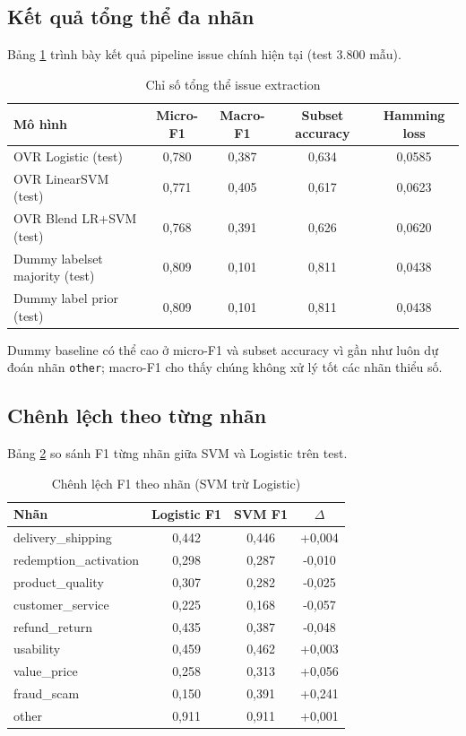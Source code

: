 ﻿\documentclass[12pt,a4paper]{article}
\begin{document}
\subsection{Kết quả tổng thể đa nhãn}
Bảng \ref{tab:issue_overall_vi} trình bày kết quả pipeline issue chính hiện tại (test 3.800 mẫu).

\begin{table}[H]
\centering
\caption{Chỉ số tổng thể issue extraction}
\label{tab:issue_overall_vi}
\begin{tabular}{lcccc}
\toprule
Mô hình & Micro-F1 & Macro-F1 & Subset accuracy & Hamming loss \\
\midrule
OVR Logistic (test) & 0,780 & 0,387 & 0,634 & 0,0585 \\
OVR LinearSVM (test) & 0,771 & 0,405 & 0,617 & 0,0623 \\
OVR Blend LR+SVM (test) & 0,768 & 0,391 & 0,626 & 0,0620 \\
Dummy labelset majority (test) & 0,809 & 0,101 & 0,811 & 0,0438 \\
Dummy label prior (test) & 0,809 & 0,101 & 0,811 & 0,0438 \\
\bottomrule
\end{tabular}
\end{table}

Dummy baseline có thể cao ở micro-F1 và subset accuracy vì gần như luôn dự đoán nhãn \texttt{other}; macro-F1 cho thấy chúng không xử lý tốt các nhãn thiểu số.

\subsection{Chênh lệch theo từng nhãn}
Bảng \ref{tab:issue_delta_vi} so sánh F1 từng nhãn giữa SVM và Logistic trên test.

\begin{table}[H]
\centering
\caption{Chênh lệch F1 theo nhãn (SVM trừ Logistic)}
\label{tab:issue_delta_vi}
\begin{tabular}{lccc}
\toprule
Nhãn & Logistic F1 & SVM F1 & $\Delta$ \\
\midrule
delivery\_shipping & 0,442 & 0,446 & +0,004 \\
redemption\_activation & 0,298 & 0,287 & -0,010 \\
product\_quality & 0,307 & 0,282 & -0,025 \\
customer\_service & 0,225 & 0,168 & -0,057 \\
refund\_return & 0,435 & 0,387 & -0,048 \\
usability & 0,459 & 0,462 & +0,003 \\
value\_price & 0,258 & 0,313 & +0,056 \\
fraud\_scam & 0,150 & 0,391 & +0,241 \\
other & 0,911 & 0,911 & +0,001 \\
\bottomrule
\end{tabular}
\end{table}
\end{document}
